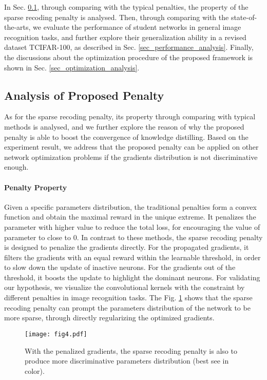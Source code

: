 \documentclass[10pt,twocolumn,letterpaper]{article}
\begin{document}
In Sec. \ref{sec_penalty_analysis},
through comparing with the typical penalties,
the property of the sparse recoding penalty is analysed.
Then,
through comparing with the state-of-the-arts,
we evaluate the performance of student networks in general image recognition tasks,
and further explore their generalization ability in a revised dataset TCIFAR-100,
as described in Sec. \ref{sec_performance_analysis}.
Finally,
the discussions about the optimization procedure of the proposed framework is shown in Sec. \ref{sec_optimization_analysis}.

\subsection{Analysis of Proposed Penalty}\label{sec_penalty_analysis}
As for the sparse recoding penalty,
its property through comparing with typical methods is analysed,
and we further explore the reason of why the proposed penalty is able to boost
the convergence of knowledge distilling.
Based on the experiment result,
we address that
the proposed penalty can be applied on
other network optimization problems
if the gradients distribution is not discriminative enough.

\paragraph{Penalty Property}
Given a specific parameters distribution,
the traditional penalties \cite{wen2016learning, zhang2016l1} form a convex function
and obtain the maximal reward in the unique extreme.
It penalizes the parameter with higher value to reduce the total loss,
for encouraging the value of parameter to close to 0.
In contrast to these methods,
the sparse recoding penalty is designed to penalize the gradients directly.
For the propagated gradients,
it filters the gradients with an equal reward within the learnable threshold,
in order to slow down the update of inactive neurons.
For the gradients out of the threshold,
it boosts the update to highlight the dominant neurons.
For validating our hypothesis,
we visualize the convolutional kernels with the constraint
by different penalties in image recognition tasks.
The Fig. \ref{fig:kernel-analysis} shows that the sparse recoding penalty
can prompt the parameters distribution of the network to be more sparse,
through directly regularizing the optimized gradients.

\begin{figure}[ht]
  \centering
  \texttt{[image: fig4.pdf]}
  \caption{With the penalized gradients, the sparse recoding penalty is also to produce
  more discriminative parameters distribution (best see in color).}
  \label{fig:kernel-analysis}
\end{figure}
\end{document}

